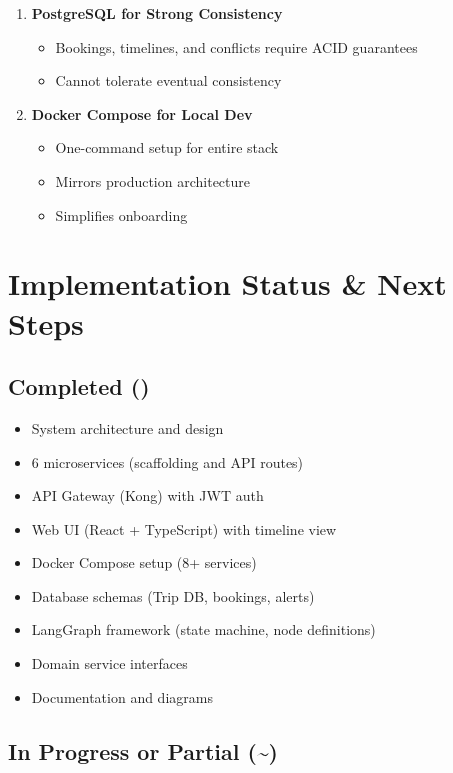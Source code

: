 \documentclass[11pt]{article}
\begin{document}
\begin{enumerate}
    \item \textbf{PostgreSQL for Strong Consistency}
    \begin{itemize}
        \item Bookings, timelines, and conflicts require ACID guarantees
        \item Cannot tolerate eventual consistency
    \end{itemize}

    \item \textbf{Docker Compose for Local Dev}
    \begin{itemize}
        \item One-command setup for entire stack
        \item Mirrors production architecture
        \item Simplifies onboarding
    \end{itemize}
\end{enumerate}

\section{Implementation Status \& Next Steps}

\subsection{Completed (\checkmark)}

\begin{itemize}
    \item System architecture and design
    \item 6 microservices (scaffolding and API routes)
    \item API Gateway (Kong) with JWT auth
    \item Web UI (React + TypeScript) with timeline view
    \item Docker Compose setup (8+ services)
    \item Database schemas (Trip DB, bookings, alerts)
    \item LangGraph framework (state machine, node definitions)
    \item Domain service interfaces
    \item Documentation and diagrams
\end{itemize}

\subsection{In Progress or Partial (\textasciitilde)}
\end{document}
